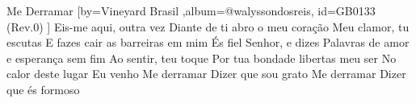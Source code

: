 \beginsong
{Me Derramar %
}[by={Vineyard Brasil %
},album={@walyssondosreis},
id={GB0133 %
(Rev.0) %
}]
\beginverse*
Eis-me aqui, outra vez
Diante de ti abro o meu coração
Meu clamor, tu escutas
E fazes cair as barreiras em mim
És fiel Senhor, e dizes
Palavras de amor e esperança sem fim
Ao sentir, teu toque
Por tua bondade libertas meu ser
No calor deste lugar
Eu venho
\endverse
\beginchorus
Me derramar
Dizer que sou grato
Me derramar
Dizer que és formoso
\endchorus

